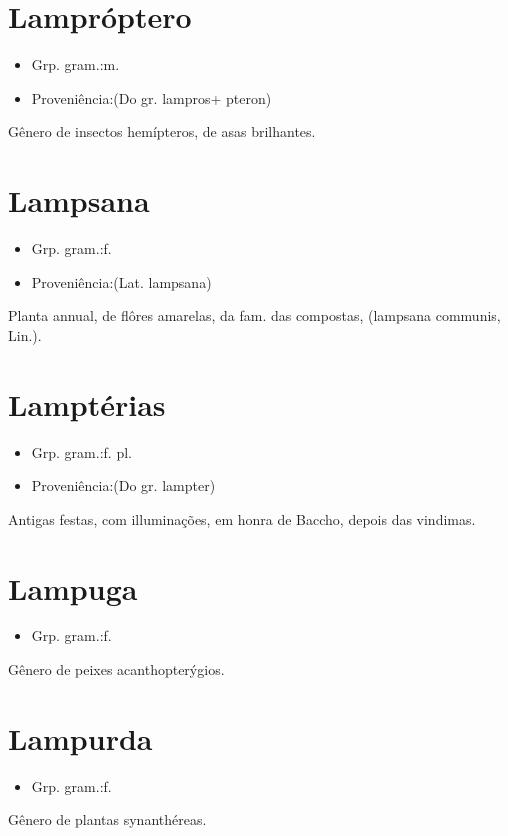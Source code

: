 \section{Lampróptero}
\begin{itemize}
\item {Grp. gram.:m.}
\end{itemize}
\begin{itemize}
\item {Proveniência:(Do gr. \textunderscore lampros\textunderscore  + \textunderscore pteron\textunderscore )}
\end{itemize}
Gênero de insectos hemípteros, de asas brilhantes.
\section{Lampsana}
\begin{itemize}
\item {Grp. gram.:f.}
\end{itemize}
\begin{itemize}
\item {Proveniência:(Lat. \textunderscore lampsana\textunderscore )}
\end{itemize}
Planta annual, de flôres amarelas, da fam. das compostas, (lampsana communis, Lin.).
\section{Lamptérias}
\begin{itemize}
\item {Grp. gram.:f. pl.}
\end{itemize}
\begin{itemize}
\item {Proveniência:(Do gr. \textunderscore lampter\textunderscore )}
\end{itemize}
Antigas festas, com illuminações, em honra de Baccho, depois das vindimas.
\section{Lampuga}
\begin{itemize}
\item {Grp. gram.:f.}
\end{itemize}
Gênero de peixes acanthopterýgios.
\section{Lampurda}
\begin{itemize}
\item {Grp. gram.:f.}
\end{itemize}
Gênero de plantas synanthéreas.
